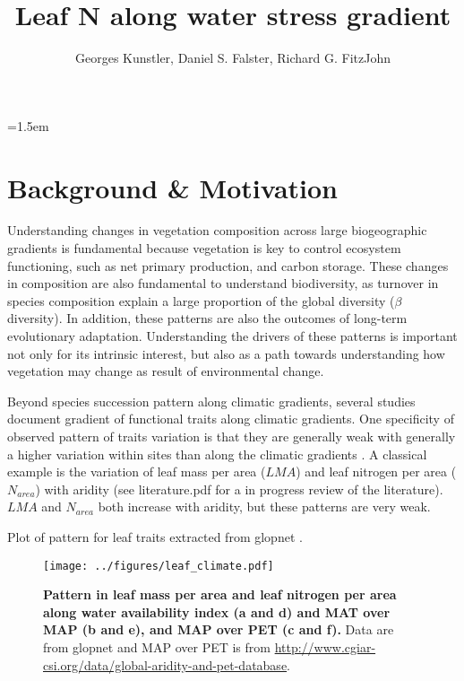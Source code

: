 \documentclass[a4paper,11pt]{article}
\title{Leaf N along water stress gradient}
\author{Georges Kunstler, Daniel S. Falster, Richard G. FitzJohn}
\date{}
\affiliation{Irstea, Grenoble, France and Department of Biological Sciences, Macquarie University,
  Sydney, Australia}
\date{}
\begin{document}
\mstitleshort
\parindent=1.5em
\addtolength{\parskip}{.3em}


\section{Background \& Motivation}

Understanding changes in vegetation composition across large biogeographic gradients is fundamental because vegetation is key to control ecosystem functioning, such as net primary production, and carbon storage. These changes in composition are also fundamental to understand biodiversity, as turnover in species composition explain a large proportion of the global diversity ($\beta$ diversity). In addition, these patterns are also the outcomes of long-term evolutionary adaptation. Understanding the drivers of these patterns is important not only for its intrinsic interest, but also as a path towards understanding how vegetation may change as result of environmental change.

Beyond species succession pattern along climatic gradients, several
studies document gradient of functional traits along climatic
gradients. One specificity of observed pattern of traits variation is
that they are generally weak with generally a higher variation within
sites than along the climatic gradients \citep[see][]{Wright-2004}. A
classical example is the variation of leaf mass per area ($LMA$) and
leaf nitrogen per area ($N_{area}$) with aridity (see literature.pdf
for a in progress review of the literature). $LMA$
\citep{Wright-2004,Onoda-2011,Moles-2014} and $N_{area}$
\citep{Wright-2005,Maire-2015} both increase with aridity, but these
patterns are very weak.


Plot of pattern for leaf traits extracted from glopnet \citep{Wright-2004}.

\begin{figure}[ht]
\centering
\texttt{[image: ../figures/leaf\_climate.pdf]}
\caption{\textbf{Pattern in leaf mass per area and leaf nitrogen per area along water availability index (a and d) and MAT over MAP (b and e), and MAP over PET (c and f).} Data are from glopnet \citep{Wright-2004} and MAP over PET is from \url{http://www.cgiar-csi.org/data/global-aridity-and-pet-database}.
\label{fig:leafpattern}}
\end{figure}
\end{document}
